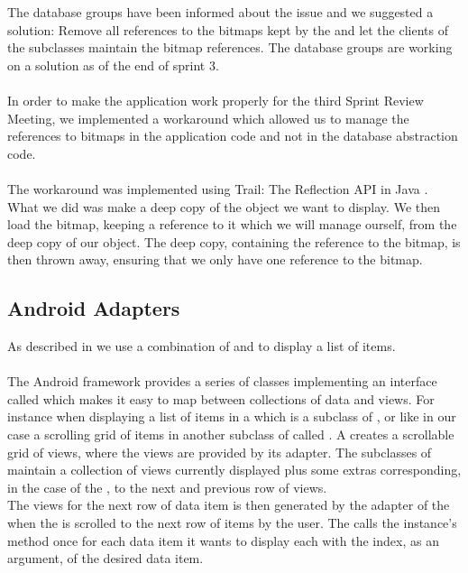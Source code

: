 The database groups have been informed about the issue and we suggested a solution: Remove all references to the bitmaps kept by the  and let the clients of the  subclasses maintain the bitmap references. The database groups are working on a solution as of the end of sprint 3.
\\\\
In order to make the \ct application work properly for the third Sprint Review Meeting, we implemented a workaround which allowed us to manage the references to bitmaps in the application code and not in the database abstraction code.
\\\\
The workaround was implemented using Trail: The Reflection API in Java \parencite{java_trail_reflection}. What we did was make a deep copy of the  object we want to display. We then load the bitmap, keeping a reference to it which we will manage ourself, from the deep copy of our object. The deep copy, containing the reference to the bitmap, is then thrown away, ensuring that we only have one reference to the bitmap.

\subsection{Android Adapters}

As described in  we use a combination of  and  to display a list of items.
\\\\
The Android framework provides a series of classes implementing an interface called  which makes it easy to map between collections of data and views. For instance when displaying a list of items in a  which is a subclass of , or like in our case a scrolling grid of items in another subclass of  called . A  creates a scrollable grid of views, where the views are provided by its adapter. The subclasses of  maintain a collection of views currently displayed plus some extras corresponding, in the case of the , to the next and previous row of views. \\

The views for the next row of data item is then generated by the adapter of the  when the  is scrolled to the next row of items by the user. The  calls the  instance's  method once for each data item it wants to display each with the index, as an argument, of the desired data item. \\

